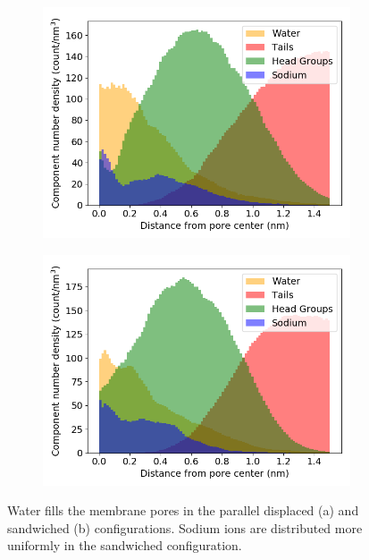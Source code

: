 \documentclass{article}
\begin{document}
  \begin{figure}
  \centering 
  \begin{subfigure}{0.45\textwidth}
        \includegraphics[width=1\linewidth]{offset_solvated_density.png}
        \caption{}
        \label{fig:offset_solvated_density}
  \end{subfigure}
  \begin{subfigure}{0.45\textwidth}
        \includegraphics[width=1\linewidth]{layered_solvated_density.png}
        \caption{}
        \label{fig:layered__solvated_density}
  \end{subfigure}
  \caption{Water fills the membrane pores in the parallel displaced (a) and 
  sandwiched (b) configurations. Sodium ions are distributed more uniformly 
  in the sandwiched configuration.}
  \label{fig:water_density}
  \end{figure}
\end{document}
